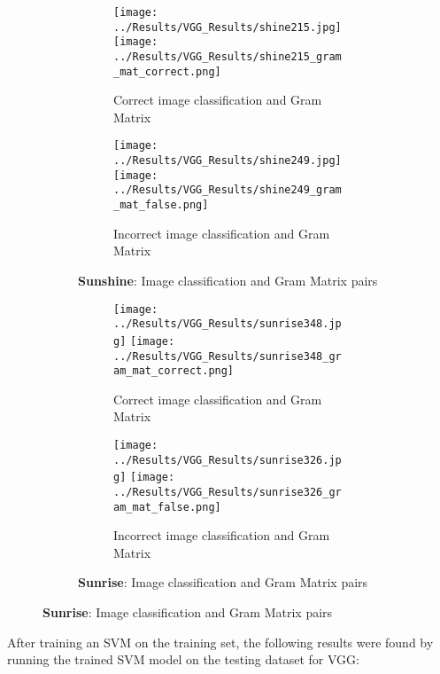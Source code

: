 \documentclass{article}
\begin{document}
\begin{figure}[H]
    \begin{subfigure}{\linewidth}
        \centering
        \begin{subfigure}{0.49\linewidth}
            \centering
            \texttt{[image: ../Results/VGG\_Results/shine215.jpg]}
            \texttt{[image: ../Results/VGG\_Results/shine215\_gram\_mat\_correct.png]}
            \caption*{Correct image classification and Gram Matrix}
        \end{subfigure}
        \begin{subfigure}{0.49\linewidth}
            \centering
            \texttt{[image: ../Results/VGG\_Results/shine249.jpg]}
            \texttt{[image: ../Results/VGG\_Results/shine249\_gram\_mat\_false.png]}
            \caption*{Incorrect image classification and Gram Matrix}
        \end{subfigure}
        \caption*{\textbf{Sunshine}: Image classification and Gram Matrix pairs}
    \end{subfigure}
    \hfill

    \begin{subfigure}{\linewidth}
        \centering
        \begin{subfigure}{0.49\linewidth}
            \centering
            \texttt{[image: ../Results/VGG\_Results/sunrise348.jpg]}
            \texttt{[image: ../Results/VGG\_Results/sunrise348\_gram\_mat\_correct.png]}
            \caption*{Correct image classification and Gram Matrix}
        \end{subfigure}
        \begin{subfigure}{0.49\linewidth}
            \centering
            \texttt{[image: ../Results/VGG\_Results/sunrise326.jpg]}
            \texttt{[image: ../Results/VGG\_Results/sunrise326\_gram\_mat\_false.png]}
            \caption*{Incorrect image classification and Gram Matrix}
        \end{subfigure}
        \caption*{\textbf{Sunrise}: Image classification and Gram Matrix pairs}
    \end{subfigure}
\end{figure}

After training an SVM on the training set, the following results were found by running the trained SVM model on the testing dataset for VGG:
\end{document}
